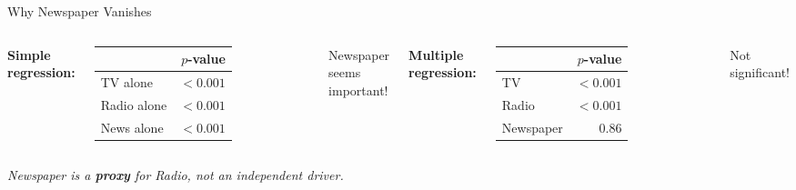 \documentclass[aspectratio=169, 11pt]{beamer}
\begin{document}
\begin{frame}{Why Newspaper Vanishes}
\begin{columns}
\textbf{Simple regression:}
\begin{tabular}{lr}
\toprule
& $p$-value \\
\midrule
TV alone & $<0.001$ \\
Radio alone & $<0.001$ \\
\textcolor{softred}{News alone} & \textcolor{softred}{$<0.001$} \\
\bottomrule
\end{tabular}

\vspace{0.3em}
Newspaper seems important!

\textbf{Multiple regression:}
\begin{tabular}{lr}
\toprule
& $p$-value \\
\midrule
TV & $<0.001$ \\
Radio & $<0.001$ \\
\textcolor{softred}{Newspaper} & \textcolor{softred}{$0.86$} \\
\bottomrule
\end{tabular}

\vspace{0.3em}
Not significant!
\end{columns}

\vspace{0.8em}
\centering
{}

\vspace{0.3em}
\textit{Newspaper is a \textbf{proxy} for Radio, not an independent driver.}
\end{frame}
\end{document}

